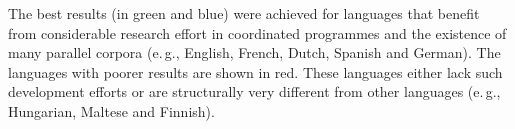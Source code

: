 \begin{multicols}{2}
The best results (in green and blue) were achieved for languages that benefit from considerable research effort in coordinated programmes and the existence of many parallel corpora (e.\,g., English, French, Dutch, Spanish and German). The languages with poorer results are shown in red. These languages either lack such development efforts or are structurally very different from other languages (e.\,g., Hungarian, Maltese and Finnish).


\end{multicols}
